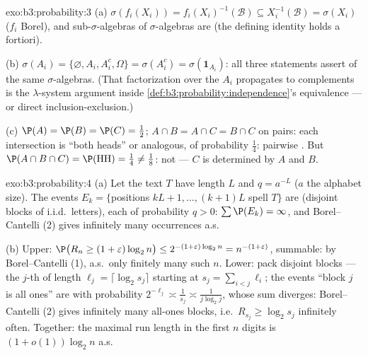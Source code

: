 \begin{solution}{exo:b3:probability:3}
(a) $\sigma(f_i(X_i)) = f_i(X_i)^{-1}(\mathcal B) \subseteq
X_i^{-1}(\mathcal B) = \sigma(X_i)$ ($f_i$ Borel), and
sub-$\sigma$-algebras of  $\sigma$-algebras are
 (the defining identity holds a fortiori).

(b) $\sigma(A_i) = \{\varnothing, A_i, A_i^c, \Omega\} =
\sigma(A_i^c) = \sigma(\mathbf 1_{A_i})$: all three
statements assert  of the same
$\sigma$-algebras. (That factorization over the $A_i$
propagates to complements is the $\lambda$-system argument
inside \cref{def:b3:probability:independence}'s equivalence
--- or direct inclusion-exclusion.)

(c) $\P(A) = \P(B) = \P(C) = \frac12$; $A\cap B = A\cap C =
B\cap C$ on pairs: each intersection is ``both heads'' or
analogous, of probability $\frac14$: pairwise .
But $\P(A\cap B\cap C) = \P(\text{HH}) = \frac14 \neq
\frac18$: not  --- $C$ is determined by $A$ and
$B$.
\end{solution}

\begin{solution}{exo:b3:probability:4}
(a) Let the text $T$ have length $L$ and $q = a^{-L}$ ($a$
the alphabet size). The events $E_k = \{$positions $kL+1,
\dots, (k+1)L$ spell $T\}$ are  (disjoint blocks
of i.i.d.\ letters), each of probability $q > 0$: $\sum\P(E_k)
= \infty$, and Borel--Cantelli (2) gives infinitely many
occurrences a.s.

(b) Upper: $\P\bigl(R_n \geq (1+\varepsilon)\log_2n\bigr)
\leq 2^{-(1+\varepsilon)\log_2n} = n^{-(1+\varepsilon)}$,
summable: by Borel--Cantelli (1), a.s.\ only finitely many
such $n$. Lower: pack disjoint blocks --- the $j$-th of
length $\ell_j = \lceil\log_2s_j\rceil$ starting at $s_j =
\sum_{i<j}\ell_i$; the events ``block $j$ is all ones'' are
 with probability $2^{-\ell_j} \asymp
\frac1{s_j} \asymp \frac1{j\log_2 j}$, whose sum diverges:
Borel--Cantelli (2) gives infinitely many all-ones blocks,
i.e.\ $R_{s_j} \geq \log_2 s_j$ infinitely often. Together:
the maximal run length in the first $n$ digits is
$(1 + o(1))\log_2n$ a.s.
\end{solution}


